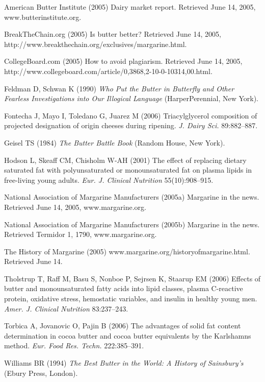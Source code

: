 \documentclass[opre,nonblindrev]{informs3} %
\begin{document}
\begin{thebibliography}{}

American Butter Institute (2005) Dairy market report. Retrieved June
14, 2005, www.butterinstitute.org.

BreakTheChain.org (2005) Is butter better? Retrieved June 14, 2005,
http://www.breakthechain.org/\break exclusives/margarine.html.

CollegeBoard.com (2005)  How to avoid plagiarism. Retrieved June 14,
2005,
http://www.collegeboard.com/\break article/0,3868,2-10-0-10314,00.html.

Feldman D, Schwan K (1990) {\it Who Put the Butter in Butterfly
and Other Fearless Investigations into Our Illogical Language}
(HarperPerennial, New York).

Fontecha J, Mayo I, Toledano G, Juarez M (2006)
Triacylglycerol composition  of projected designation
of origin cheeses during ripening. {\it J. Dairy Sci.} 89:882--887.

Geisel TS (1984) {\it The Butter Battle Book\/} (Random House, New York).

Hodson L, Skeaff CM, Chisholm W-AH (2001) The effect of
replacing dietary saturated fat with polyunsaturated or
monounsaturated fat on plasma lipids in free-living young adults.
{\it Eur. J. Clinical Nutrition} 55(10):908--915.

National Association of Margarine Manufacturers (2005a) Margarine in
the news. Retrieved June 14, 2005, www.margarine.org.

National Association of Margarine Manufacturers (2005b) Margarine in
the news. Retrieved Termidor 1, 1790, www.margarine.org.

The History of Margarine (2005) www.margarine.org/historyofmargarine.html. Retrieved June 14.

Tholstrup T, Raff M, Basu S, Nonboe P, Sejrsen K, Staarup EM (2006) 
Effects of butter and mono\-un\-saturated fatty acids
into lipid classes, plasma C-reactive protein, oxidative stress,
hemostatic variables, and insulin in healthy young men. {\it Amer. J.
Clinical Nutrition} 83:237--243.

Torbica A, Jovanovic O, Pajin B (2006) The advantages of solid
fat content determination in cocoa butter and cocoa butter
equivalents by the Karlshamns method. {\it Eur. Food Res. Techn.} 222:385--391.

Williams BR (1994) {\it The Best Butter in the World: A History of
Sainsbury's} (Ebury Press, London).

\end{thebibliography}

\end{document}
